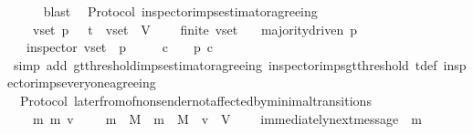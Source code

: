 \begin{isabellebody}
\ \ \ \ \isamarkupfalse%
\ blast\isanewline
{}\isamarkupfalse%
%
\endisatagproof
{\isafoldproof}%
%
\isadelimproof
\isanewline
%
\endisadelimproof
\isanewline
\isanewline
{}\isamarkupfalse%
\ {\isacharparenleft}\ Protocol{\isacharparenright}\ inspector{\isacharunderscore}imps{\isacharunderscore}estimator{\isacharunderscore}agreeing\ {\isacharcolon}\isanewline
\ \ {\isachardoublequoteopen}{\isasymforall}\ {\isasymsigma}\ v{\isacharunderscore}set\ p{\isachardot}\ {\isasymsigma}\ {\isasymin}\ {\isasymSigma}t\ {\isasymand}\ v{\isacharunderscore}set\ {\isasymsubseteq}\ V\ \isanewline
\ \ {\isasymlongrightarrow}\ finite\ v{\isacharunderscore}set\isanewline
\ \ {\isasymlongrightarrow}\ majority{\isacharunderscore}driven\ p\isanewline
\ \ {\isasymlongrightarrow}\ inspector\ {\isacharparenleft}v{\isacharunderscore}set{\isacharcomma}\ {\isasymsigma}{\isacharcomma}\ p{\isacharparenright}\ \isanewline
\ \ {\isasymlongrightarrow}\ {\isacharparenleft}{\isasymforall}\ c\ {\isasymin}\ {\isasymepsilon}\ {\isasymsigma}{\isachardot}\ p\ c{\isacharparenright}{\isachardoublequoteclose}\isanewline
%
\isadelimproof
\ \ %
\endisadelimproof
%
\isatagproof
{}\isamarkupfalse%
\ {\isacharparenleft}simp\ add{\isacharcolon}\ gt{\isacharunderscore}threshold{\isacharunderscore}imps{\isacharunderscore}estimator{\isacharunderscore}agreeing\ inspector{\isacharunderscore}imps{\isacharunderscore}gt{\isacharunderscore}threshold\ {\isasymSigma}t{\isacharunderscore}def\ inspector{\isacharunderscore}imps{\isacharunderscore}everyone{\isacharunderscore}agreeing{\isacharparenright}%
\endisatagproof
{\isafoldproof}%
%
\isadelimproof
\isanewline
%
\endisadelimproof
\isanewline
\isanewline
\isanewline
\isanewline
\isanewline
\isanewline
\isanewline
{}\isamarkupfalse%
\ {\isacharparenleft}\ Protocol{\isacharparenright}\ later{\isacharunderscore}from{\isacharunderscore}of{\isacharunderscore}non{\isacharunderscore}sender{\isacharunderscore}not{\isacharunderscore}affected{\isacharunderscore}by{\isacharunderscore}minimal{\isacharunderscore}transitions\ {\isacharcolon}\isanewline
\ \ {\isachardoublequoteopen}{\isasymforall}\ {\isasymsigma}\ m\ m{\isacharprime}\ v{\isachardot}\ {\isasymsigma}\ {\isasymin}\ {\isasymSigma}\ {\isasymand}\ m\ {\isasymin}\ M\ {\isasymand}\ m{\isacharprime}\ {\isasymin}\ M\ {\isasymand}\ v\ {\isasymin}\ V\ \isanewline
\ \ {\isasymlongrightarrow}\ immediately{\isacharunderscore}next{\isacharunderscore}message\ {\isacharparenleft}{\isasymsigma}{\isacharcomma}\ m{\isacharprime}{\isacharparenright}\isanewline

\end{isabellebody}
